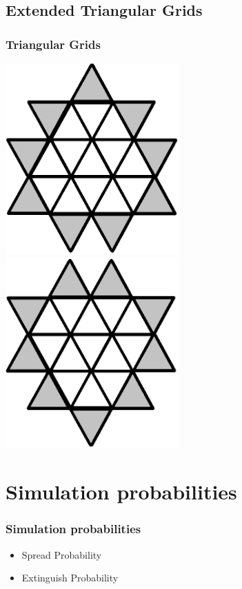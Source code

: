 \documentclass{beamer}
\begin{document}
\subsection{Extended Triangular Grids} 
\begin{frame}
\frametitle{Triangular Grids}
\includegraphics[width=0.5\textwidth]{imgs/extendedtriangle1.png}
\includegraphics[width=0.5\textwidth]{imgs/extendedtriangle2.png}
\end{frame}

\section{Simulation probabilities} 

\begin{frame}
\frametitle{Simulation probabilities}
\begin{itemize}
\item{Spread Probability}
\item{Extinguish Probability}
\end{itemize}
\end{frame}
\end{document}
